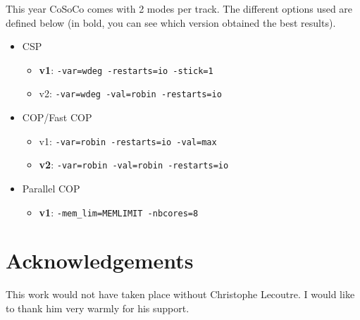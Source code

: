 \documentclass{llncs}
\begin{document}
    \medskip
    This year CoSoCo comes with 2 modes per track. The different options used are defined below (in bold, you can see which version obtained the best results).

    \begin{itemize}
        \item     CSP
        \begin{itemize}
            \item   {\bf v1}: {\tt -var=wdeg -restarts=io -stick=1}
            \item v2: {\tt -var=wdeg -val=robin -restarts=io}
        \end{itemize}
        \item COP/Fast COP
        \begin{itemize}
            \item v1: {\tt -var=robin -restarts=io -val=max}
            \item {\bf v2}: {\tt -var=robin -val=robin -restarts=io}
        \end{itemize}
        \item Parallel COP
        \begin{itemize}
            \item \textbf{v1}: {\tt  -mem_lim=MEMLIMIT -nbcores=8}
        \end{itemize}
    \end{itemize}





    \section*{Acknowledgements}
    This work would not have taken place without Christophe Lecoutre. I would like to thank him very warmly for his support.

    
    
\end{document}
